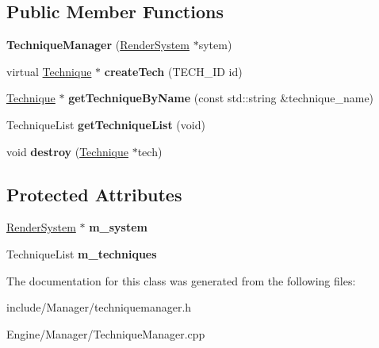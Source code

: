 \subsection*{Public Member Functions}
\begin{DoxyCompactItemize}
\item 
\hypertarget{classEngine_1_1TechniqueManager_a5420f238921d1ff6d4d3c0678f4dad46}{}{\bfseries Technique\+Manager} (\hyperlink{classEngine_1_1RenderSystem}{Render\+System} $\ast$sytem)\label{classEngine_1_1TechniqueManager_a5420f238921d1ff6d4d3c0678f4dad46}

\item 
\hypertarget{classEngine_1_1TechniqueManager_a87d9ae26cd488a3e49aeea96fefad418}{}virtual \hyperlink{classEngine_1_1Technique}{Technique} $\ast$ {\bfseries create\+Tech} (T\+E\+C\+H\+\_\+\+I\+D id)\label{classEngine_1_1TechniqueManager_a87d9ae26cd488a3e49aeea96fefad418}

\item 
\hypertarget{classEngine_1_1TechniqueManager_a141b2a91ae2587aef711d2f0fa29e48f}{}\hyperlink{classEngine_1_1Technique}{Technique} $\ast$ {\bfseries get\+Technique\+By\+Name} (const std\+::string \&technique\+\_\+name)\label{classEngine_1_1TechniqueManager_a141b2a91ae2587aef711d2f0fa29e48f}

\item 
\hypertarget{classEngine_1_1TechniqueManager_ae4ce1709d1b560ad94f032154442301e}{}Technique\+List {\bfseries get\+Technique\+List} (void)\label{classEngine_1_1TechniqueManager_ae4ce1709d1b560ad94f032154442301e}

\item 
\hypertarget{classEngine_1_1TechniqueManager_a1db1deb2b7b72a7b62ac7ef1a84a9183}{}void {\bfseries destroy} (\hyperlink{classEngine_1_1Technique}{Technique} $\ast$tech)\label{classEngine_1_1TechniqueManager_a1db1deb2b7b72a7b62ac7ef1a84a9183}

\end{DoxyCompactItemize}
\subsection*{Protected Attributes}
\begin{DoxyCompactItemize}
\item 
\hypertarget{classEngine_1_1TechniqueManager_a0a8febcd829ab8952df43521432b74c9}{}\hyperlink{classEngine_1_1RenderSystem}{Render\+System} $\ast$ {\bfseries m\+\_\+system}\label{classEngine_1_1TechniqueManager_a0a8febcd829ab8952df43521432b74c9}

\item 
\hypertarget{classEngine_1_1TechniqueManager_a40b2f5cfa95ecdd9c06317c6aabe47be}{}Technique\+List {\bfseries m\+\_\+techniques}\label{classEngine_1_1TechniqueManager_a40b2f5cfa95ecdd9c06317c6aabe47be}

\end{DoxyCompactItemize}


The documentation for this class was generated from the following files\+:\begin{DoxyCompactItemize}
\item 
include/\+Manager/techniquemanager.\+h\item 
Engine/\+Manager/Technique\+Manager.\+cpp\end{DoxyCompactItemize}
